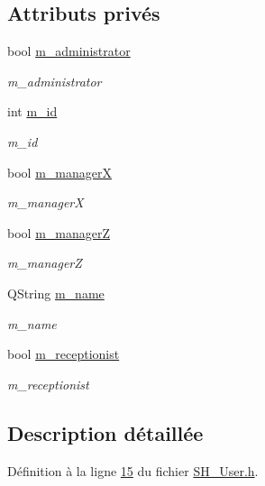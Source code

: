 \subsection*{Attributs privés}
\begin{DoxyCompactItemize}
\item 
bool \hyperlink{classSH__User_af1e8d755b1bdfd9ab41a9cfc14b4c95e}{m\-\_\-administrator}
\begin{DoxyCompactList}\small\item\em m\-\_\-administrator \end{DoxyCompactList}\item 
int \hyperlink{classSH__User_a701e1d1238c488e46e8d1dcc7dbe8dc0}{m\-\_\-id}
\begin{DoxyCompactList}\small\item\em m\-\_\-id \end{DoxyCompactList}\item 
bool \hyperlink{classSH__User_ab9c9475b85e1449da1476eb7b4157a4d}{m\-\_\-manager\-X}
\begin{DoxyCompactList}\small\item\em m\-\_\-manager\-X \end{DoxyCompactList}\item 
bool \hyperlink{classSH__User_aff16f3d1a135c4b6673b69c42cffe86d}{m\-\_\-manager\-Z}
\begin{DoxyCompactList}\small\item\em m\-\_\-manager\-Z \end{DoxyCompactList}\item 
Q\-String \hyperlink{classSH__User_abaf53f509224bdd7f8224259bffea2d6}{m\-\_\-name}
\begin{DoxyCompactList}\small\item\em m\-\_\-name \end{DoxyCompactList}\item 
bool \hyperlink{classSH__User_a86a5f8feb41c4238c5f022e9fbbe2e44}{m\-\_\-receptionist}
\begin{DoxyCompactList}\small\item\em m\-\_\-receptionist \end{DoxyCompactList}\end{DoxyCompactItemize}


\subsection{Description détaillée}


Définition à la ligne \hyperlink{SH__User_8h_source_l00015}{15} du fichier \hyperlink{SH__User_8h_source}{S\-H\-\_\-\-User.\-h}.



